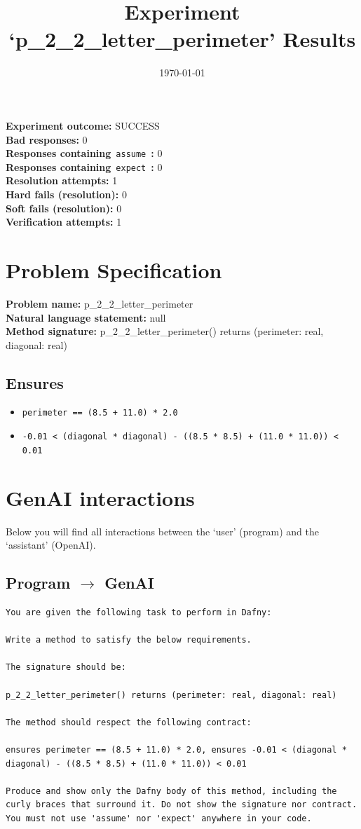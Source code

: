 \documentclass{article}
\begin{document}
\title{Experiment `p\_2\_2\_letter\_perimeter' Results}
\author{\today}
\date{}
\maketitle
\textbf{Experiment outcome: }SUCCESS
\\\textbf{Bad responses: }0
\\\textbf{Responses containing}~\texttt{assume}~\textbf{: }0
\\\textbf{Responses containing}~\texttt{expect}~\textbf{: }0
\\\textbf{Resolution attempts: }1
\\\textbf{Hard fails (resolution): }0
\\\textbf{Soft fails (resolution): }0
\\\textbf{Verification attempts: }1
\section*{Problem Specification}
\textbf{Problem name: }p\_2\_2\_letter\_perimeter
\\\textbf{Natural language statement: }null
\\\textbf{Method signature: }p\_2\_2\_letter\_perimeter() returns (perimeter: real, diagonal: real)
\subsection*{Ensures}
\begin{itemize}
\item \texttt{perimeter == (8.5 + 11.0) * 2.0}
\item \texttt{-0.01 < (diagonal * diagonal) - ((8.5 * 8.5) + (11.0 * 11.0)) < 0.01}
\end{itemize}
\clearpage
\section*{GenAI interactions}
Below you will find all interactions between the `user' (program) and the `assistant' (OpenAI).
\subsection*{Program $\rightarrow$ GenAI}
\begin{lstlisting}
You are given the following task to perform in Dafny:

Write a method to satisfy the below requirements.

The signature should be:

p_2_2_letter_perimeter() returns (perimeter: real, diagonal: real)

The method should respect the following contract:

ensures perimeter == (8.5 + 11.0) * 2.0, ensures -0.01 < (diagonal * diagonal) - ((8.5 * 8.5) + (11.0 * 11.0)) < 0.01

Produce and show only the Dafny body of this method, including the curly braces that surround it. Do not show the signature nor contract. You must not use 'assume' nor 'expect' anywhere in your code.
\end{lstlisting}
\end{document}
